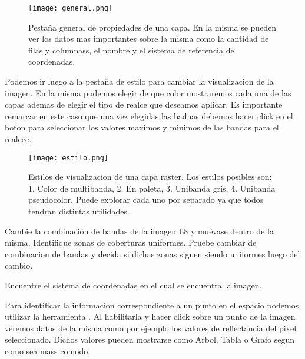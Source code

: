 \begin{figure}[htb]
\begin{center}
    \texttt{[image: general.png]}
\end{center}
\caption{Pestaña general de propiedades de una capa. En la misma se pueden ver
    los datos mas importantes sobre la misma como la cantidad de filas y
    columnass, el nombre y el sistema de referencia de coordenadas.}
\label{fig:general}
\end{figure}

Podemos ir luego a la pestaña de estilo para cambiar la visualizacion de la
imagen. En la misma podemos elegir de que color mostraremos cada una de las
capas ademas de elegir el tipo de realce que deseamos aplicar. Es importante
remarcar en este caso que una vez elegidas las badnas debemos hacer click en el
boton  para seleccionar los valores maximos y minimos de las
bandas para el realcec.

\begin{figure}[htb]
\begin{center}
    \texttt{[image: estilo.png]}
\end{center}
\caption{Estilos de visualizacion de una capa raster. Los estilos posibles son:
    1. Color de multibanda, 2. En paleta, 3. Unibanda gris, 4. Unibanda
    pseudocolor. Puede explorar cada uno por separado ya que todos tendran
    distintas utilidades.}
\label{fig:estilo}
\end{figure}

\begin{act} 
    Cambie la combinación de bandas de la imagen L8 y muévase  dentro de la
    misma. Identifique zonas de coberturas uniformes. Pruebe cambiar de
    combinacion de bandas y decida si dichas zonas siguen siendo uniformes luego
    del cambio.
\end{act}

\begin{act}
    Encuentre el sistema de coordenadas en el cual se encuentra la imagen.
\end{act}

Para identificar la informacion correspondiente a un punto en el espacio podemos
utilizar la herramienta . Al habilitarla y
hacer click sobre un punto de la imagen veremos datos de la misma como por
ejemplo los valores de reflectancia del pixel seleccionado. Dichos valores
pueden mostrarse como Arbol, Tabla o Grafo segun como sea mass comodo.

